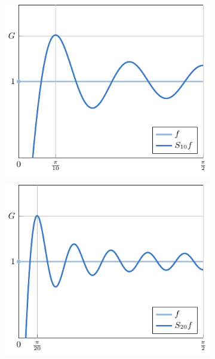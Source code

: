 \documentclass[a4paper, 12pt, oneside]{book}
\begin{document}
\begin{figure}[H]
\centering
\begin{subfigure}[b]{0.49\textwidth}
    \centering
    \includegraphics{./plot5/main.pdf}
\end{subfigure}
\begin{subfigure}[b]{0.49\textwidth}
    \centering
    \includegraphics{./plot6/main.pdf}
\end{subfigure}
\par\bigskip
\begin{subfigure}[b]{0.49\textwidth}
    \centering

\end{subfigure}
\end{figure}
\end{document}
